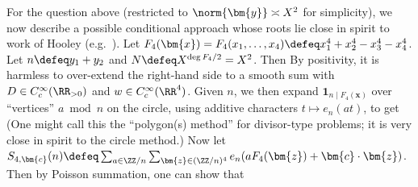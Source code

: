 \documentclass[12pt]{report}
\begin{document}




For the question above (restricted to $\norm{\bm{y}}\asymp X^2$ for simplicity),
we now describe a possible conditional approach whose roots lie close in spirit to work of Hooley (e.g.~\cites{hooley1981waring,hooley1983some}).
Let $F_4(\bm{x})=F_4(x_1,\dots,x_4)\defeq x_1^4+x_2^4-x_3^4-x_4^4$.
Let $n\defeq y_1+y_2$ and $N\defeq X^{\deg{F_4}/2} = X^2$.
Then
By positivity,
it is harmless to over-extend the right-hand side to a smooth sum
with $D\in C^\infty_c(\RR_{>0})$ and $w\in C^\infty_c(\RR^4)$.
Given $n$,
we then expand $\bm{1}_{n\mid F_4(\bm{x})}$
over ``vertices'' $a\bmod{n}$ on the circle,
using additive characters $t\mapsto e_n(at)$,
to get
(One might call this
the ``polygon(s) method'' for divisor-type problems;
it is very close in spirit to the circle method.)
Now let
$S_{4,\bm{c}}(n)
\defeq \sum_{a\in \ZZ/n}\sum_{\bm{z}\in (\ZZ/n)^4}e_n(aF_4(\bm{z}) + \bm{c}\cdot\bm{z})$.
Then by Poisson summation,
one can show that

\end{document}
